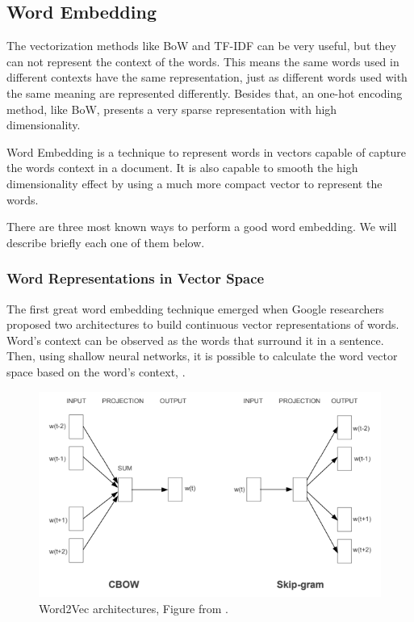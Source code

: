 	\subsection{Word Embedding}
	
	The vectorization methods like BoW and TF-IDF can be very useful, but they can not represent the context of the words. This means the same words used in different contexts have the same representation, just as different words used with the same meaning are represented differently. Besides that, an one-hot encoding method, like BoW, presents a very sparse representation with high dimensionality. 
	
	Word Embedding is a technique to represent words in vectors capable of capture the words context in a document. It is also capable to smooth the high dimensionality effect by using a much more compact vector to represent the words. 
		
	There are three most known ways to perform a good word embedding. We will describe briefly each one of them below. 
	
	\subsubsection{Word Representations in Vector Space}
	
	The first great word embedding technique emerged when Google researchers proposed two architectures to build continuous vector representations of words. Word's context can be observed as the words that surround it in a sentence. Then, using shallow neural networks, it is possible to calculate the word vector space based on the word's context, \cite{mikolov2013efficient}.
	
	\begin{figure}[h!]
		\centering
		\includegraphics[width=0.8\linewidth]{01.Chapters/02.Background/word2vec_architectures}
		\caption{Word2Vec architectures, Figure from  \cite{mikolov2013efficient}.}
		\label{fig:word2vecarchitectures}
	\end{figure}
	
